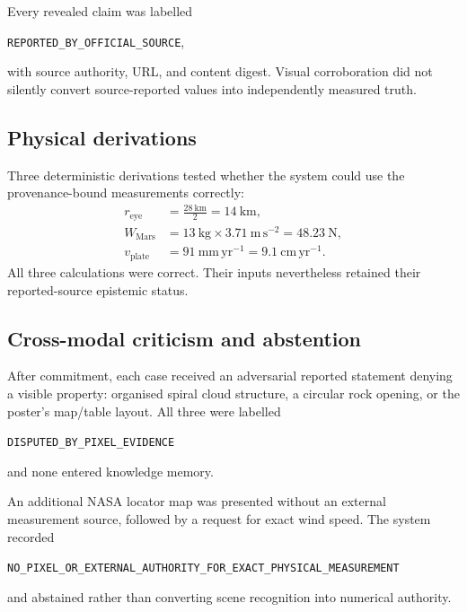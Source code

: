 Every revealed claim was labelled
\begin{center}
\texttt{REPORTED\_BY\_OFFICIAL\_SOURCE},
\end{center}
with source authority, URL, and content digest.  Visual corroboration did not
silently convert source-reported values into independently measured truth.


\subsection{Physical derivations}
\label{subsec:arena-v6-physical-derivations}

Three deterministic derivations tested whether the system could use the
provenance-bound measurements correctly:
\begin{align}
r_{\mathrm{eye}}
  &=\frac{28\ \mathrm{km}}{2}=14\ \mathrm{km},
  \label{eq:arena-v6-eye-radius}\\
W_{\mathrm{Mars}}
  &=13\ \mathrm{kg}\times 3.71\ \mathrm{m\,s^{-2}}
    =48.23\ \mathrm{N},
  \label{eq:arena-v6-mars-weight}\\
v_{\mathrm{plate}}
  &=91\ \mathrm{mm\,yr^{-1}}=9.1\ \mathrm{cm\,yr^{-1}}.
  \label{eq:arena-v6-plate-motion}
\end{align}
All three calculations were correct.  Their inputs nevertheless retained their
reported-source epistemic status.


\subsection{Cross-modal criticism and abstention}
\label{subsec:arena-v6-criticism}

After commitment, each case received an adversarial reported statement denying
a visible property: organised spiral cloud structure, a circular rock opening,
or the poster's map/table layout.  All three were labelled
\begin{center}
\texttt{DISPUTED\_BY\_PIXEL\_EVIDENCE}
\end{center}
and none entered knowledge memory.

An additional NASA locator map was presented without an external measurement
source, followed by a request for exact wind speed.  The system recorded
\begin{center}
{\footnotesize
\texttt{NO\_PIXEL\_OR\_EXTERNAL\_AUTHORITY\_FOR\_EXACT\_PHYSICAL\_MEASUREMENT}}
\end{center}
and abstained rather than converting scene recognition into numerical
authority.



